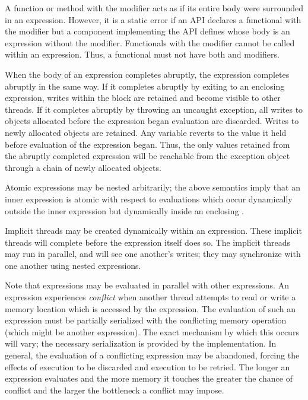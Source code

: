 A function or method with the modifier  acts as if its entire
body were surrounded in an  expression.
However, it is a static error if an API declares a functional 
with the modifier  but a component implementing the API
defines  whose body is an  expression without the
modifier.  Functionals with the modifier  cannot be called
within an  expression.  Thus, a
functional must not have both  and  modifiers.

When the body of an  expression completes abruptly, the
 expression completes abruptly in the same way.  If it
completes abruptly by exiting to an enclosing  expression,
writes within the block are retained and become visible to other
threads.  If it completes abruptly by throwing an uncaught exception,
all writes to objects allocated before the 
expression began evaluation are discarded.  Writes to newly
allocated objects are retained.  Any variable reverts to the value it
held before evaluation of the  expression began.  Thus, the
only values retained from the abruptly completed  expression
will be reachable from the exception object through a chain of newly
allocated objects.

Atomic expressions may be nested arbitrarily; the above semantics
imply that an inner  expression is atomic with respect to
evaluations which occur dynamically outside the inner 
expression but dynamically inside an enclosing .

Implicit threads may be created dynamically within an 
expression.  These implicit threads will complete before the
 expression itself does so.  The implicit threads may
run in parallel, and will see one another's writes; they may
synchronize with one another using nested  expressions.

Note that  expressions may be evaluated in parallel with
other expressions.  An  expression experiences
\emph{conflict} when another thread attempts to read or write a memory
location which is accessed by the  expression.  The
evaluation of such an expression must be partially serialized with the
conflicting memory operation (which might be another 
expression).  The exact mechanism by which this occurs will vary; the
necessary serialization is provided by the implementation.  In
general, the evaluation of a conflicting  expression may
be abandoned, forcing the effects of execution to be discarded and
execution to be retried.  The longer an  expression
evaluates and the more memory it touches the greater the chance of
conflict and the larger the bottleneck a conflict may impose.

